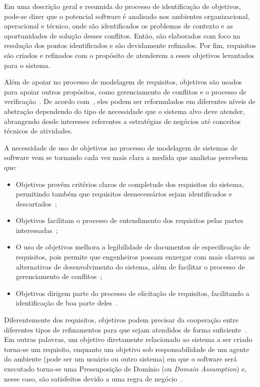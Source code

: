 Em uma descrição geral e resumida do processo de identificação de objetivos, pode-se dizer que o potencial software é analisado nos ambientes organizacional, operacional e técnico, onde são identificados os problemas de contexto e as oportunidades de solução desses conflitos. Então, são elaborados com foco na resolução dos pontos identificados e são devidamente refinados. Por fim, requisitos são criados e refinados com o propósito de atenderem a esses objetivos levantados para o sistema. 

Além de apoiar no processo de modelagem de requisitos, objetivos são usados para apoiar outros propósitos, como gerenciamento de conflitos e o processo de verificação~\cite{lapouchnian2005goal}. De acordo com~, eles podem ser reformulados em diferentes níveis de abstração dependendo do tipo de necessidade que o sistema alvo deve atender, abrangendo desde interesses referentes a estratégias de negócios até conceitos técnicos de atividades.

A necessidade de uso de objetivos no processo de modelagem de sistemas de software vem se tornando cada vez mais clara a medida que analistas percebem que:
\begin{itemize}
	\item Objetivos provêm critérios claros de completude dos requisitos do sistema, permitindo também que requisitos desnecessários sejam identificados e descartados~\cite{van2001goal};
	
	\item Objetivos facilitam o processo de entendimento dos requisitos pelas partes interessadas~\cite{van2001goal};
	
	\item O uso de objetivos melhora a legibilidade de documentos de especificação de requisitos, pois permite que engenheiros possam enxergar com mais clareza as alternativas de desenvolvimento do sistema, além de facilitar o processo de gerenciamento de conflitos~\cite{van2001goal};
	
	\item Objetivos dirigem parte do processo de elicitação de requisitos, facilitando a identificação de boa parte deles~\cite{lapouchnian2005goal}.	
\end{itemize}

Diferentemente dos requisitos, objetivos podem precisar da cooperação entre diferentes tipos de refinamentos para que sejam atendidos de forma suficiente~\cite{dardenne1993goal}. Em outras palavras, um objetivo diretamente relacionado ao sistema a ser criado torna-se um requisito, enquanto um objetivo sob responsabilidade de um agente  do ambiente (pode ser um usuário ou outro sistema) em que o software será executado torna-se uma Pressuposição de Domínio (ou \textit{Domain Assumption}) e, nesse caso, são satisfeitos devido a uma regra de negócio~\cite{van2001goal, van1998managing}.

